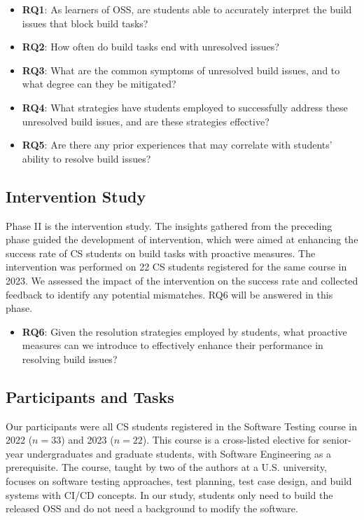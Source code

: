 \documentclass[10pt, conference]{IEEEtran}
\begin{document}
\begin{itemize}[leftmargin=*]

\item \textbf{RQ1}: As learners of OSS, are students able to accurately interpret the build issues that block build tasks?

    

\item \textbf{RQ2}: How often do build tasks end with unresolved issues?

    

\item \textbf{RQ3}: What are the common symptoms of unresolved build issues, and to what degree can they be mitigated?

    

\item \textbf{RQ4}: What strategies have students employed to successfully address these unresolved build issues, and are these strategies effective?

    

\item \textbf{RQ5}: Are there any prior experiences that may correlate with students’ ability to resolve build issues?

\end{itemize}

\subsection{Intervention Study} Phase II is the intervention study. The insights gathered from the preceding phase guided the development of intervention, which were aimed at enhancing the success rate of CS students on build tasks with proactive measures. The intervention was performed on 22 CS students registered for the same course in 2023. We assessed the impact of the intervention on the success rate and collected feedback to identify any potential mismatches. RQ6 will be answered in this phase.

\begin{itemize}[leftmargin=*]

\item \textbf{RQ6}: Given the resolution strategies employed by students, what proactive measures can we introduce to effectively enhance their performance in resolving build issues?

\end{itemize}

\subsection{Participants and Tasks}
Our participants were all CS students registered in the Software Testing course in 2022 ($n = 33$) and 2023 ($n = 22$). This course is a cross-listed elective for senior-year undergraduates and graduate students, with Software Engineering as a prerequisite. The course, taught by two of the authors at a U.S. university, focuses on software testing approaches, test planning, test case design, and build systems with CI/CD concepts. In our study, students only need to build the released OSS and do not need a background to modify the software.
\end{document}
